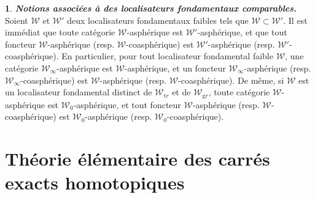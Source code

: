 \documentclass[francais]{smfart}
\theoremstyle{plain}
\theoremstyle{remark}
\theoremstyle{definition}
\newtheorem{paragr}[thm]{}
\numberwithin{equation}{thm}
\begin{document}
\begin{paragr} {\emph{\textbf{{Notions associées à des localisateurs fondamentaux comparables}.\ }}} \label{changloc}
Soient ${\mathcal{W}}$ et ${\mathcal{W}}'$ deux localisateurs fondamentaux faibles tels que ${\mathcal{W}}\subset{\mathcal{W}}'$. Il est immédiat que toute catégorie ${\mathcal{W}}${\nobreakdash}-asphérique est ${\mathcal{W}}'${\nobreakdash}-asphérique, et que tout foncteur ${\mathcal{W}}${\nobreakdash}-asphérique (resp. ${\mathcal{W}}${\nobreakdash}-coasphérique) est ${\mathcal{W}}'${\nobreakdash}-asphérique (resp. ${\mathcal{W}}'${\nobreakdash}-coasphérique). En particulier, pour tout localisateur fondamental faible ${\mathcal{W}}$, une catégorie ${{\mathcal{W}}_{\infty}}${\nobreakdash}-asphérique est ${\mathcal{W}}${\nobreakdash}-asphérique, et un foncteur ${{\mathcal{W}}_{\infty}}${\nobreakdash}-asphérique (resp. ${{\mathcal{W}}_{\infty}}${\nobreakdash}-coasphérique) est ${\mathcal{W}}${\nobreakdash}-asphérique (resp. ${\mathcal{W}}${\nobreakdash}-coasphérique). De même, si ${\mathcal{W}}$ est un localisateur fondamental distinct de ${{\mathcal{W}}_{\mathrm tr}}$ et de ${{\mathcal{W}}_{\mathrm gr}}$, toute catégorie ${\mathcal{W}}${\nobreakdash}-asphérique est ${{\mathcal{W}}_{0}}${\nobreakdash}-asphérique, et tout foncteur ${\mathcal{W}}${\nobreakdash}-asphérique (resp. ${\mathcal{W}}${\nobreakdash}-co\-asphé\-rique) est ${{\mathcal{W}}_{0}}${\nobreakdash}-asphérique (resp. ${{\mathcal{W}}_{0}}${\nobreakdash}-coasphérique).
\end{paragr}

\section{Théorie élémentaire des carrés exacts homotopiques}
\end{document}
